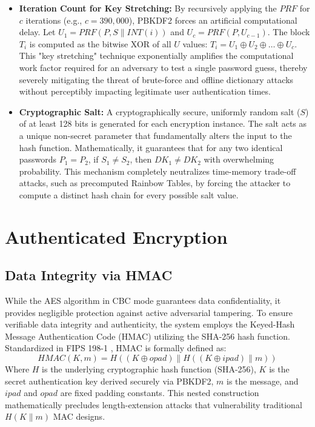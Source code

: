 \begin{itemize}
    \item \textbf{Iteration Count for Key Stretching:} By recursively applying the $PRF$ for $c$ iterations (e.g., $c = 390,000$), PBKDF2 forces an artificial computational delay. Let $U_1 = PRF(P, S \parallel INT(i))$ and $U_c = PRF(P, U_{c-1})$. The block $T_i$ is computed as the bitwise XOR of all $U$ values: $T_i = U_1 \oplus U_2 \oplus \dots \oplus U_c$. This "key stretching" technique exponentially amplifies the computational work factor required for an adversary to test a single password guess, thereby severely mitigating the threat of brute-force and offline dictionary attacks without perceptibly impacting legitimate user authentication times.
    \item \textbf{Cryptographic Salt:} A cryptographically secure, uniformly random salt ($S$) of at least 128 bits is generated for each encryption instance. The salt acts as a unique non-secret parameter that fundamentally alters the input to the hash function. Mathematically, it guarantees that for any two identical passwords $P_1 = P_2$, if $S_1 \neq S_2$, then $DK_1 \neq DK_2$ with overwhelming probability. This mechanism completely neutralizes time-memory trade-off attacks, such as precomputed Rainbow Tables, by forcing the attacker to compute a distinct hash chain for every possible salt value.
\end{itemize}

\section{Authenticated Encryption}
\subsection{Data Integrity via HMAC}
While the AES algorithm in CBC mode guarantees data confidentiality, it provides negligible protection against active adversarial tampering. To ensure verifiable data integrity and authenticity, the system employs the Keyed-Hash Message Authentication Code (HMAC) utilizing the SHA-256 hash function. Standardized in FIPS 198-1 \cite{fips198_1}, HMAC is formally defined as:
\begin{equation}
    HMAC(K, m) = H((K \oplus opad) \parallel H((K \oplus ipad) \parallel m))
\end{equation}
Where $H$ is the underlying cryptographic hash function (SHA-256), $K$ is the secret authentication key derived securely via PBKDF2, $m$ is the message, and $ipad$ and $opad$ are fixed padding constants. This nested construction mathematically precludes length-extension attacks that vulnerability traditional $H(K \parallel m)$ MAC designs.

